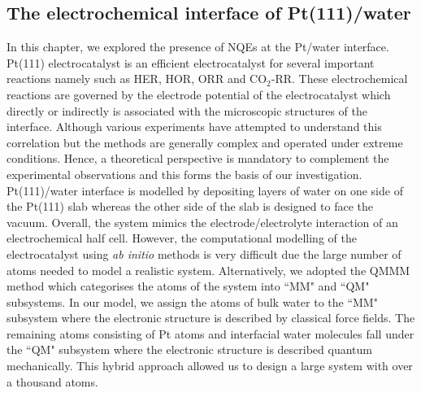 \subsection{The electrochemical interface of Pt(111)/water}

\noindent In this chapter, we explored the presence of NQEs at the Pt/water interface. Pt(111) electrocatalyst is an efficient electrocatalyst for several important reactions namely such as HER, HOR, ORR and CO$_2$-RR. These electrochemical reactions are governed by the electrode potential of the electrocatalyst which directly or indirectly is associated with the microscopic structures of the interface. Although various experiments\cite{magnussen2019toward,tian2022visualizing} have attempted to understand this correlation but the methods are generally complex and operated under extreme conditions. Hence, a theoretical perspective is mandatory to complement the experimental observations and this forms the basis of our investigation. Pt(111)/water interface is modelled by depositing layers of water on one side of the Pt(111) slab whereas the other side of the slab is designed to face the vacuum. Overall, the system mimics the electrode/electrolyte interaction of an electrochemical half cell. However, the computational modelling of the electrocatalyst using \textit{ab initio} methods is very difficult due the large number of atoms needed to model a realistic system. Alternatively, we adopted the QMMM method which categorises the atoms of the system into ``MM" and ``QM" subsystems. In our model, we assign the atoms of bulk water to the ``MM" subsystem where the electronic structure is described by classical force fields. The remaining atoms consisting of Pt atoms and interfacial water molecules fall under the ``QM" subsystem where the electronic structure is described quantum mechanically. This hybrid approach allowed us to design a large system with over a thousand atoms.

